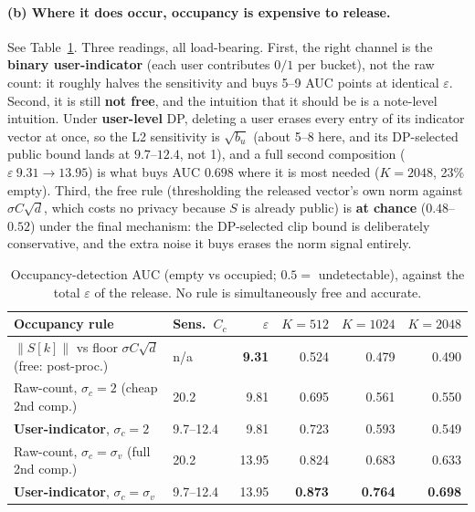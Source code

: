 \documentclass[pdflatex,sn-mathphys-num,12pt]{sn-jnl}
\theoremstyle{thmstyleone}%
\theoremstyle{thmstyletwo}%
\theoremstyle{thmstylethree}%
\newcommand{\eps}{\varepsilon}
\newcommand{\norm}[1]{\left\lVert #1 \right\rVert}
\begin{document}
\paragraph{(b) Where it does occur, occupancy is expensive to release.} See
Table~\ref{tab:occupancy-detect}. Three readings, all load-bearing. First, the right channel is
the \textbf{binary user-indicator} (each user contributes $0/1$ per bucket), not the raw count: it
roughly halves the sensitivity and buys 5--9 AUC points at identical $\eps$. Second, it is still
\textbf{not free}, and the intuition that it should be is a note-level intuition. Under
\textbf{user-level} DP, deleting a user erases every entry of its indicator vector at once, so the
L2 sensitivity is $\sqrt{b_u}$ (about 5--8 here, and its DP-selected public bound lands at
$9.7$--$12.4$, not 1), and a full second composition ($\eps\ 9.31 \to 13.95$) is what buys AUC
$0.698$ where it is most needed ($K = 2048$, 23\% empty). Third, the free rule (thresholding the
released vector's own norm against $\sigma C \sqrt{d}$, which costs no privacy because $S$ is
already public) is \textbf{at chance} ($0.48$--$0.52$) under the final mechanism: the DP-selected
clip bound is deliberately conservative, and the extra noise it buys erases the norm signal
entirely.

\begin{table}[t]
  \centering
  \caption{Occupancy-detection AUC (empty vs occupied; $0.5 =$ undetectable), against the total
  $\eps$ of the release. No rule is simultaneously free and accurate.}
  \label{tab:occupancy-detect}
  \small
  \setlength{\tabcolsep}{4pt}
  \begin{tabular}{@{}llrrrr@{}}
    \toprule
    Occupancy rule & Sens.\ $C_c$ & $\eps$ & $K = 512$ & $K = 1024$ & $K = 2048$ \\
    \midrule
    $\norm{S[k]}$ vs floor $\sigma C \sqrt{d}$ (free: post-proc.) & n/a & \textbf{9.31} & 0.524 & 0.479 & 0.490 \\
    Raw-count, $\sigma_c = 2$ (cheap 2nd comp.)                   & 20.2 & 9.81 & 0.695 & 0.561 & 0.550 \\
    \textbf{User-indicator}, $\sigma_c = 2$                       & 9.7--12.4 & 9.81 & 0.723 & 0.593 & 0.549 \\
    Raw-count, $\sigma_c = \sigma_v$ (full 2nd comp.)             & 20.2 & 13.95 & 0.824 & 0.683 & 0.633 \\
    \textbf{User-indicator}, $\sigma_c = \sigma_v$                & 9.7--12.4 & 13.95 & \textbf{0.873} & \textbf{0.764} & \textbf{0.698} \\
    \bottomrule
  \end{tabular}
\end{table}
\end{document}
